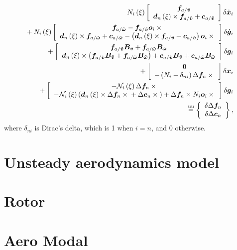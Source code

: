 \begin{align}
	N_i\plbr{\xi} \sqbr{\matr{c}{
		\T{f}_{a/\tilde{\T{v}}} \\
		\T{d}_n\plbr{\xi} \times \T{f}_{a/\tilde{\T{v}}}
		+ \T{c}_{a/\tilde{\T{v}}}
	}} \delta\dot{\T{x}}_i
	\nonumber \\
%
	\mbox{}
	+ N_i\plbr{\xi} \sqbr{\matr{c}{
		\T{f}_{a/\tilde{\T{\omega}}}
		- \T{f}_{a/\tilde{\T{v}}} \T{o}_i \times{} \\
		\T{d}_n\plbr{\xi} \times \T{f}_{a/\tilde{\T{\omega}}}
		+ \T{c}_{a/\tilde{\T{\omega}}}
		- \plbr{
			\T{d}_n\plbr{\xi} \times \T{f}_{a/\tilde{\T{v}}}
			+ \T{c}_{a/\tilde{\T{v}}}
		} \T{o}_i \times{}
	}} \delta\dot{\T{g}}_i
	\nonumber \\
%
	\mbox{}
	+ \sqbr{\matr{c}{
		\T{f}_{a/\tilde{\T{v}}} \TT{B}_{\tilde{\T{v}}}
			+ \T{f}_{a/\tilde{\T{\omega}}} \TT{B}_{\tilde{\T{\omega}}} \\
		\T{d}_n\plbr{\xi} \times \plbr{
			\T{f}_{a/\tilde{\T{v}}} \TT{B}_{\tilde{\T{v}}}
				+ \T{f}_{a/\tilde{\T{\omega}}} \TT{B}_{\tilde{\T{\omega}}}
		}
		+ \T{c}_{a/\tilde{\T{v}}} \TT{B}_{\tilde{\T{v}}}
			+ \T{c}_{a/\tilde{\T{\omega}}} \TT{B}_{\tilde{\T{\omega}}}
	}} \delta\T{g}_i
	\nonumber \\
%
	\mbox{}
	+ \sqbr{\matr{c}{
		\TT{0} \\
		- \plbr{
			N_i - \delta_{ni}
		} \Delta\T{f}_n \times{}
	}} \delta\T{x}_i
	\nonumber \\
%
	\mbox{}
	+ \sqbr{\matr{c}{
		- \mathcal{N}_i\plbr{\xi} \Delta\T{f}_n \times{} \\
		- \mathcal{N}_i\plbr{\xi} \plbr{
			\T{d}_n\plbr{\xi} \times \Delta\T{f}_n \times{}
			+ \Delta\T{c}_n \times{}
		}
		+ \Delta\T{f}_n \times N_i \T{o}_i \times{}
	}} \delta\T{g}_i
	\nonumber \\
%
	\equu
	\cubr{\cvvect{
		\delta\Delta\T{f}_n \\
		\delta\Delta\T{c}_n
	}}
	,
\end{align}
where $\delta_{ni}$ is Dirac's delta, which is 1 when $i=n$, and 0 otherwise.

\section{Unsteady aerodynamics model}


\section{Rotor}


\section{Aero Modal}

